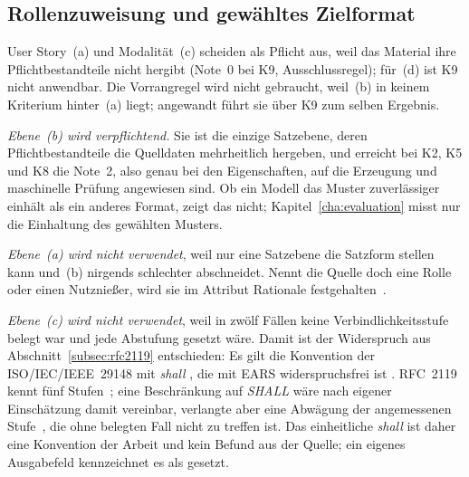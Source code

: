 \documentclass[11pt,a4paper]{report}
\begin{document}
\subsection{Rollenzuweisung und gewähltes Zielformat}
\label{subsec:rollenzuweisung}

User Story~(a) und Modalität~(c) scheiden als Pflicht aus, weil das
Material ihre Pflichtbestandteile nicht hergibt (Note~0 bei K9,
Ausschlussregel); für~(d) ist K9 nicht anwendbar. Die Vorrangregel wird
nicht gebraucht, weil~(b) in keinem Kriterium hinter~(a) liegt;
angewandt führt sie über K9 zum selben Ergebnis.

\emph{Ebene~(b) wird verpflichtend.} Sie ist die einzige Satzebene,
deren Pflichtbestandteile die Quelldaten mehrheitlich hergeben, und
erreicht bei K2, K5 und K8 die Note~2, also genau bei den Eigenschaften,
auf die Erzeugung und maschinelle Prüfung angewiesen sind. Ob ein Modell
das Muster zuverlässiger einhält als ein anderes Format, zeigt das
nicht; Kapitel~\ref{cha:evaluation} misst nur die Einhaltung des
gewählten Musters.

\emph{Ebene~(a) wird nicht verwendet}, weil nur eine Satzebene die
Satzform stellen kann und~(b) nirgends schlechter abschneidet.
Nennt die Quelle doch eine Rolle oder einen Nutznießer, wird sie im
Attribut Rationale festgehalten~\cite[Abschn.~5.2.8.2]{iso29148}.

\emph{Ebene~(c) wird nicht verwendet}, weil in zwölf Fällen keine
Verbindlichkeitsstufe belegt war und jede Abstufung gesetzt wäre. Damit
ist der Widerspruch aus Abschnitt~\ref{subsec:rfc2119} entschieden: Es
gilt die Konvention der ISO/IEC/IEEE~29148 mit \emph{shall}
\cite[Abschn.~5.2.4]{iso29148}, die mit EARS widerspruchsfrei ist
\cite[Abschn.~4.1]{mavin2009ears}. RFC~2119 kennt fünf
Stufen~\cite[Abschn.~1--5]{rfc2119}; eine Beschränkung auf \emph{SHALL}
wäre nach eigener Einschätzung damit vereinbar, verlangte aber eine
Abwägung der angemessenen Stufe~\cite[Abschn.~6]{rfc2119}, die ohne
belegten Fall nicht zu treffen ist. Das einheitliche \emph{shall}
ist daher eine Konvention der Arbeit und kein Befund aus der Quelle; ein
eigenes Ausgabefeld kennzeichnet es als gesetzt.
\end{document}
